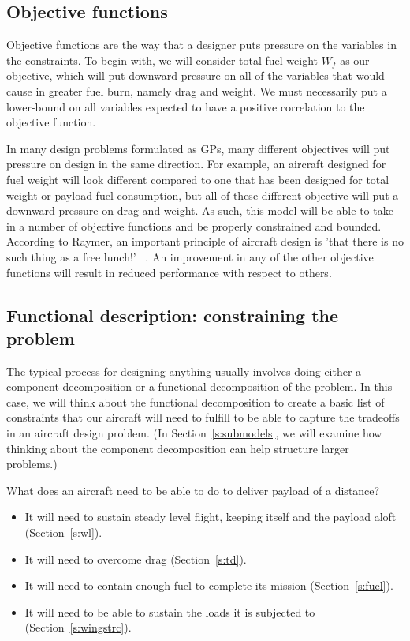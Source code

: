 \subsection{Objective functions}
\label{s:objective}

Objective functions are the way that a designer puts pressure on the variables 
in the constraints. To begin with, we will consider
total fuel weight $W_f$ as our objective, which will put
downward pressure on all of the variables that would cause in greater fuel burn, namely
drag and weight. We must necessarily put a lower-bound on all variables expected to
have a positive correlation to the objective function.

In many design problems
formulated as \gls{GP}s, many different objectives will put pressure on design
in the same direction. For example, an aircraft designed for fuel weight will look
different compared to one
that has been designed for total weight or payload-fuel consumption, but all of
these different objective will put a downward pressure on drag and weight.
As such, this model will be able to take in a number of objective functions
and be properly constrained and bounded. According to Raymer, an important
principle of aircraft design is 'that there is no such thing as a free lunch!'
~\cite[pg.26]{raymer}. An improvement in any of the other objective functions
will result in reduced performance with respect to others.

\subsection{Functional description: constraining the problem}

The typical process for designing anything usually involves doing either a
component decomposition or a functional decomposition of the problem. In
this case, we will think about the functional decomposition to create a
basic list of constraints that our aircraft will need to fulfill to be
able to capture the tradeoffs in an aircraft design problem. (In
Section~\ref{s:submodels}, we will examine how thinking about the component decomposition
can help structure larger problems.)

What does an aircraft need to be able to do to deliver payload of a distance?
\begin{itemize}
	\item It will need to sustain steady
    level flight, keeping itself and the payload aloft (Section~\ref{s:wl}).
    \item It will need to overcome drag (Section~\ref{s:td}).
	\item It will need to contain enough fuel to complete its mission
        (Section~\ref{s:fuel}).
	\item It will need to be able to sustain the loads it is
    subjected to (Section~\ref{s:wingstrc}).
\end{itemize}

